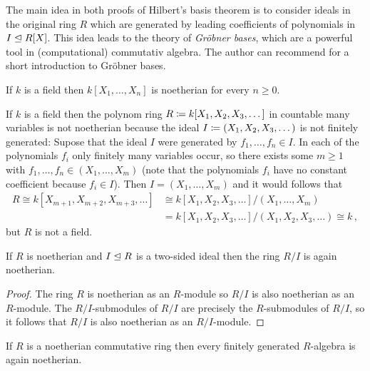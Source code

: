 \begin{remark}
  The main idea in both proofs of Hilbert’s basis theorem is to consider ideals in the original ring $R$ which are generated by leading coefficients of polynomials in $I \trianglelefteq R[X]$.
  This idea leads to the theory of \emph{Gröbner bases}, which are a powerful tool in (computational) commutativ algebra.
  The author can recommend \cite[Section~9.6]{DummitFoote2004} for a short introduction to Gröbner bases.
\end{remark}


\begin{example}
  If $k$ is a field then $k[X_1, \dotsc, X_n]$ is noetherian for every $n \geq 0$.
\end{example}


\begin{example}
  If $k$ is a field then the polynom ring $R \coloneqq k[X_1, X_2, X_3, \dotsc]$ in countable many variables is not noetherian because the ideal $I \coloneqq (X_1, X_2, X_3, \dotsc)$ is not finitely generated:
  Supose that the ideal $I$ were generated by $f_1, \dotsc, f_n \in I$.
  In each of the polynomials $f_i$ only finitely many variables occur, so there exists some $m \geq 1$ with $f_1, \dotsc, f_n \in (X_1, \dotsc, X_m)$ (note that the polynomials $f_i$ have no constant coefficient because $f_i \in I$).
  Then $I = (X_1, \dotsc, X_m)$ and it would follows that
  \begin{align*}
            R
     \cong  k[X_{m+1}, X_{m+2}, X_{m+3}, \dotsc]
    &\cong  k[X_1, X_2, X_3, \dotsc]/(X_1, \dotsc, X_m)  \\
    &=      k[X_1, X_2, X_3, \dotsc]/(X_1, X_2, X_3, \dotsc)
     \cong  k \,,
  \end{align*}
  but $R$ is not a field.
\end{example}


\begin{lemma}
  \label{lemma: quotient rings are again noetherian}
  If $R$ is noetherian and $I \trianglelefteq R$ is a two-sided ideal then the ring $R/I$ is again noetherian.
\end{lemma}


\begin{proof}
  The ring $R$ is noetherian as an $R$-module so $R/I$ is also noetherian as an $R$-module.
  The $R/I$-submodules of $R/I$ are precisely the $R$-submodules of $R/I$, so it follows that $R/I$ is also noetherian as an $R/I$-module.
\end{proof}


\begin{corollary}
  \label{corollary: finite type preserves noetherian}
  If $R$ is a noetherian commutative ring then every finitely generated $R$-algebra is again noetherian.
\end{corollary}


